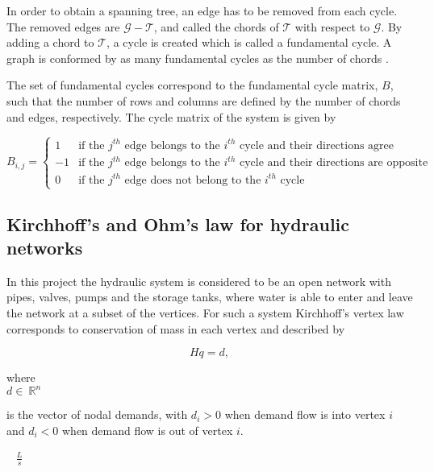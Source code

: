 In order to obtain a spanning tree, an edge has to be removed from each cycle. The removed edges are $\mathcal{G} - \mathcal{T}$, and called the chords of $\mathcal{T}$ with respect to $\mathcal{G}$. By adding a chord to $\mathcal{T}$, a cycle is created which is called a fundamental cycle. A graph is conformed by as many fundamental cycles as the number of chords \cite{deo2017graph}.

The set of fundamental cycles correspond to the fundamental cycle matrix, $B$, such that the number of rows and columns are defined by the number of chords and edges, respectively. The cycle matrix of the system is given by

\begin{equation}
\label{DiGraphCycle}
 B_{i,j} =
		\left\{
		\begin{array}{ll}
		
		1 			&     \text{if the $j^{th}$ edge belongs to the $i^{th}$ cycle and their directions agree}	
\\
		-1          &     \text{if the $j^{th}$ edge belongs to the $i^{th}$ cycle and their directions are opposite}
\\
        0           &     \text{if the $j^{th}$ edge does not belong to the $i^{th}$ cycle}
		\end{array}
		\right.
\end{equation}	

\subsection{Kirchhoff's and Ohm's law for hydraulic networks}
\label{kirchhoffs_law}

In this project the hydraulic system is considered to be an open network with pipes, valves, pumps and the storage tanks, where water is able to enter and leave the network at a subset of the vertices. For such a system Kirchhoff's vertex law corresponds to conservation of mass in each vertex and described by

\begin{equation}
  \label{vertexlaw_open}
  Hq = d,
\end{equation}

  \begin{minipage}[t]{0.20\textwidth}
where\\
\hspace*{8mm} $d \in \: \mathbb{R}^{n}$ 
\end{minipage}
\begin{minipage}[t]{0.68\textwidth}
\vspace*{2mm}
is the vector of nodal demands, with $d_i > 0$ when demand flow is into vertex $i$ and $d_i < 0$ when demand flow is out of vertex $i$.
\end{minipage}
\begin{minipage}[t]{0.10\textwidth}
\vspace*{2mm}
\textcolor{White}{te}$\unit{\frac{L}{s}}$
\end{minipage}

